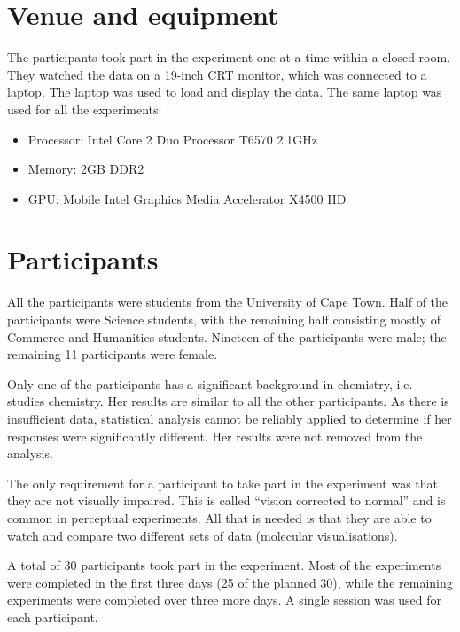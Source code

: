 
\section{Venue and equipment}
\label{sec:experiment_venue}

The participants took part in the experiment one at a time within a closed
room. They watched the data on a 19-inch CRT monitor, which was connected to a
laptop. The laptop was used to load and display the data. The same laptop was
used for all the experiments: \begin{itemize} \item Processor: Intel Core 2 Duo
Processor T6570 2.1GHz \item Memory: 2GB DDR2 \item GPU: Mobile Intel Graphics
Media Accelerator X4500 HD \end{itemize}


\section{Participants}
\label{sec:experiment_participants}

All the participants were students from the University of Cape Town. Half of
the participants were Science students, with the remaining half consisting
mostly of Commerce and Humanities students. Nineteen of the participants were
male; the remaining 11 participants were female.

Only one of the participants has a significant background in chemistry, i.e.
studies chemistry. Her results are similar to all the other participants. As
there is insufficient data, statistical analysis cannot be reliably applied to
determine if her responses were significantly different. Her results were not
removed from the analysis.

The only requirement for a participant to take part in the experiment was that
they are not visually impaired. This is called ``vision corrected to normal''
and is common in perceptual experiments. All that is needed is that they are
able to watch and compare two different sets of data (molecular
visualisations).

A total of 30 participants took part in the experiment. Most of the experiments
were completed in the first three days (25 of the planned 30), while the
remaining experiments were completed over three more days. A single session was
used for each participant.

